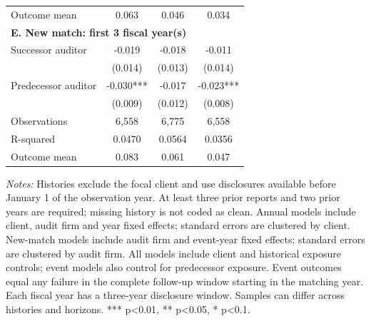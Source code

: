 \begin{table}[htbp]
\begin{threeparttable}
\begin{tabular}{p{}ccc}
Outcome mean & 0.063 & 0.046 & 0.034 \\
\multicolumn{4}{l}{\textbf{E. New match: first 3 fiscal year(s)}} \\
Successor auditor & -0.019 & -0.018 & -0.011 \\
 & (0.014) & (0.013) & (0.014) \\
Predecessor auditor & -0.030*** & -0.017 & -0.023*** \\
 & (0.009) & (0.012) & (0.008) \\
Observations & 6,558 & 6,775 & 6,558 \\
R-squared & 0.0470 & 0.0564 & 0.0356 \\
Outcome mean & 0.083 & 0.061 & 0.047 \\
\bottomrule
\end{tabular}
\begin{tablenotes}\footnotesize
\item \raggedright \textit{Notes:} Histories exclude the focal client and use disclosures available before January 1 of the observation year. At least three prior reports and two prior years are required; missing history is not coded as clean. Annual models include client, audit firm and year fixed effects; standard errors are clustered by client. New-match models include audit firm and event-year fixed effects; standard errors are clustered by audit firm. All models include client and historical exposure controls; event models also control for predecessor exposure. Event outcomes equal any failure in the complete follow-up window starting in the matching year. Each fiscal year has a three-year disclosure window. Samples can differ across histories and horizons. *** p<0.01, ** p<0.05, * p<0.1.
\end{tablenotes}
\end{threeparttable}
\end{table}

